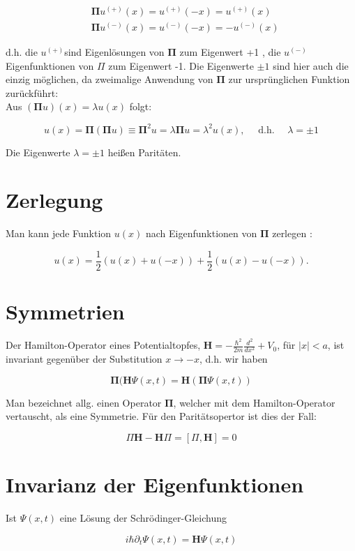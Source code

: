\documentclass[10pt, letterpaper]{article}
\begin{document}
$$
\begin{aligned}
& \boldsymbol{\Pi} u^{(+)}(x)=u^{(+)}(-x)=u^{(+)}(x) \\
& \boldsymbol{\Pi} u^{(-)}(x)=u^{(-)}(-x)=-u^{(-)}(x)
\end{aligned}
$$

d.h. die $u^{(+)}$sind Eigenlösungen von $\boldsymbol{\Pi}$ zum Eigenwert +1 , die $u^{(-)}$Eigenfunktionen von $\Pi$ zum Eigenwert -1. Die Eigenwerte $\pm 1$ sind hier auch die einzig möglichen, da zweimalige Anwendung von $\boldsymbol{\Pi}$ zur ursprünglichen Funktion zurückführt:\\
Aus $(\boldsymbol{\Pi} u)(x)=\lambda u(x)$ folgt:

$$
u(x)=\boldsymbol{\Pi}(\boldsymbol{\Pi} u) \equiv \boldsymbol{\Pi}^{2} u=\lambda \boldsymbol{\Pi} u=\lambda^{2} u(x), \quad \text { d.h. } \quad \lambda= \pm 1
$$

Die Eigenwerte $\lambda= \pm 1$ heißen Paritäten.

\section*{Zerlegung}
Man kann jede Funktion $u(x)$ nach Eigenfunktionen von $\boldsymbol{\Pi}$ zerlegen :

$$
u(x)=\frac{1}{2}(u(x)+u(-x))+\frac{1}{2}(u(x)-u(-x)) .
$$

\section*{Symmetrien}
Der Hamilton-Operator eines Potentialtopfes, $\mathbf{H}=-\frac{\hbar^{2}}{2 m} \frac{d^{2}}{d x^{2}}+V_{0}$, für $|x|<a$, ist invariant gegenüber der Substitution $x \rightarrow-x$, d.h. wir haben

$$
\boldsymbol{\Pi}(\mathbf{H} \Psi(x, t)=\mathbf{H}(\boldsymbol{\Pi} \Psi(x, t))
$$

Man bezeichnet allg. einen Operator $\boldsymbol{\Pi}$, welcher mit dem Hamilton-Operator vertauscht, als eine Symmetrie. Für den Paritätsopertor ist dies der Fall:

$$
\Pi \mathbf{H}-\mathbf{H} \Pi=[\Pi, \mathbf{H}]=0
$$

\section*{Invarianz der Eigenfunktionen}
Ist $\Psi(x, t)$ eine Lösung der Schrödinger-Gleichung

$$
i \hbar \partial_{t} \Psi(x, t)=\mathbf{H} \Psi(x, t)
$$
\end{document}
